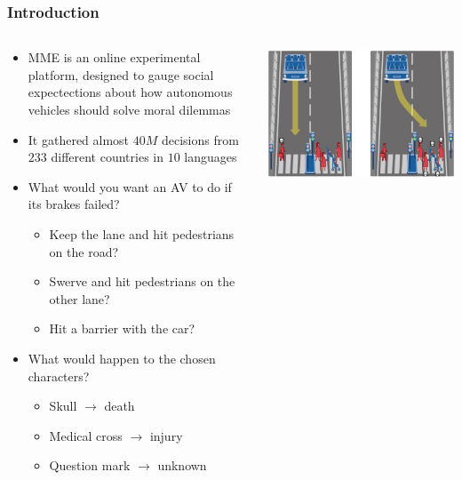 \documentclass[aspectratio=169]{beamer}
\begin{document}
\begin{frame}
    \frametitle{Introduction}
    \begin{columns}
        \begin{column}{0.6\linewidth}
            \begin{itemize}
                \item MME \cite{mme} is an online experimental platform, designed to gauge social expectections about how autonomous vehicles should solve moral dilemmas
                \item It gathered almost $40M$ decisions from $233$ different countries in $10$ languages
                \item What would you want an AV to do if its brakes failed?
                \begin{itemize}
                    \item Keep the lane and hit pedestrians on the road?
                    \item Swerve and hit pedestrians on the other lane?
                    \item Hit a barrier with the car?
                \end{itemize}
                \item What would happen to the chosen characters?
                \begin{itemize}
                    \item Skull $\rightarrow$ death
                    \item Medical cross $\rightarrow$ injury
                    \item Question mark $\rightarrow$ unknown
                \end{itemize}
            \end{itemize}
        \end{column}
        \begin{column}{0.4\linewidth}
            \includegraphics[width=1.0\linewidth]{assets/example-mme.jpg}
        \end{column}
    \end{columns}
\end{frame}
\end{document}
